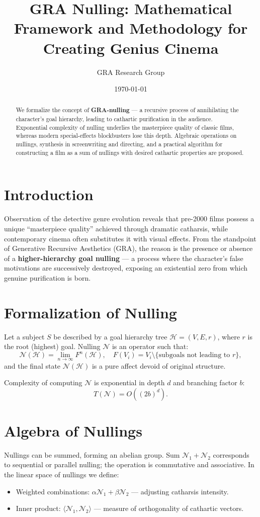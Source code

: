 \documentclass[12pt,a4paper]{article}
\title{GRA Nulling: Mathematical Framework and Methodology for Creating Genius Cinema}
\author{GRA Research Group}
\date{\today}
\begin{document}
\maketitle

\begin{abstract}
We formalize the concept of \textbf{GRA-nulling} --- a recursive process of annihilating the character's goal hierarchy, leading to cathartic purification in the audience. Exponential complexity of nulling underlies the masterpiece quality of classic films, whereas modern special-effects blockbusters lose this depth. Algebraic operations on nullings, synthesis in screenwriting and directing, and a practical algorithm for constructing a film as a sum of nullings with desired cathartic properties are proposed.
\end{abstract}

\section{Introduction}
Observation of the detective genre evolution reveals that pre-2000 films possess a unique ``masterpiece quality'' achieved through dramatic catharsis, while contemporary cinema often substitutes it with visual effects. From the standpoint of Generative Recursive Aesthetics (GRA), the reason is the presence or absence of a \textbf{higher-hierarchy goal nulling} --- a process where the character's false motivations are successively destroyed, exposing an existential zero from which genuine purification is born.

\section{Formalization of Nulling}
Let a subject $S$ be described by a goal hierarchy tree $\mathcal{H} = (V, E, r)$, where $r$ is the root (highest) goal. Nulling $\mathcal{N}$ is an operator such that:
\[
\mathcal{N}(\mathcal{H}) = \lim_{n\to\infty} F^n(\mathcal{H}),\quad F(V_i) = V_i \setminus \{\text{subgoals not leading to } r\},
\]
and the final state $\mathcal{N}(\mathcal{H})$ is a pure affect devoid of original structure.

Complexity of computing $\mathcal{N}$ is exponential in depth $d$ and branching factor $b$:
\[
T(\mathcal{N}) = O((2b)^d).
\]

\section{Algebra of Nullings}
Nullings can be summed, forming an abelian group. Sum $\mathcal{N}_1 + \mathcal{N}_2$ corresponds to sequential or parallel nulling; the operation is commutative and associative. In the linear space of nullings we define:
\begin{itemize}
\item Weighted combinations: $\alpha\mathcal{N}_1 + \beta\mathcal{N}_2$ --- adjusting catharsis intensity.
\item Inner product: $\langle \mathcal{N}_1, \mathcal{N}_2 \rangle$ --- measure of orthogonality of cathartic vectors.
\end{itemize}
\end{document}
